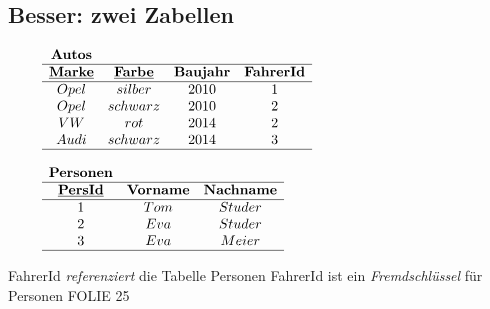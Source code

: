 \documentclass[../DatenbankenFS23.tex]{subfiles}
\begin{document}
\subsection*{Besser: zwei Zabellen}
\begin{figure}[ht]
    \centering
    $\begin{matrix}
        \textbf{Autos}\\
        \hline
        \underline{\textbf{Marke}} & \underline{\textbf{Farbe}} & \textbf{Baujahr} & \textbf{FahrerId}\\
        \hline
        Opel & silber & 2010 & 1\\
        Opel & schwarz & 2010 & 2\\
        VW & rot & 2014 & 2\\
        Audi & schwarz & 2014 & 3\\
        \hline
    \end{matrix}$
\end{figure}
\begin{figure}[ht]
    \centering
    $\begin{matrix}
        \textbf{Personen}\\
        \hline
        \underline{\textbf{PersId}} & \textbf{Vorname} & \textbf{Nachname}\\
        \hline
        1 & Tom & Studer\\
        2 & Eva & Studer\\
        3 & Eva  & Meier\\
        \hline
    \end{matrix}$
\end{figure} \newline
    FahrerId \emph{referenziert} die Tabelle Personen \newline
    FahrerId ist ein \emph{Fremdschlüssel} für Personen
FOLIE 25
\end{document}
